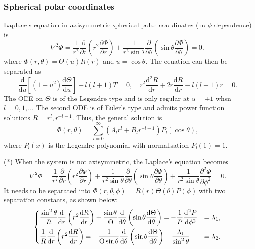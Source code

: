 \documentclass{article}
\begin{document}
\subsubsection{Spherical polar coordinates}
Laplace's equation in axisymmetric spherical polar coordinates (no $\phi$ dependence) is 
\[
    \nabla ^{2} \Phi = \frac{1}{r^{2} } \frac{\partial }{\partial r} \left(r ^{2} \frac{\partial \Phi }{\partial r} \right) + \frac{1}{r^{2} \sin{\theta }}\frac{\partial }{\partial \theta } \left( \sin{\theta} \frac{\partial \Phi }{\partial \theta } \right) = 0,
\]
where $\Phi(r, \theta) = \Theta(u) R(r)$ and $u = \cos{\theta }.$ The equation can then be separated as
\[
    \frac{\mathrm{d}}{\mathrm{d}u} \left[ (1-u^{2}) \frac{\mathrm{d}\Theta }{\mathrm{d}u} \right] + l(l+1) T = 0, \quad 
    r^{2} \frac{\mathrm{d}^{2} R}{\mathrm{d}r} + 2 r \frac{\mathrm{d}R}{\mathrm{d}r} - l(l+1)r = 0.
\]
The ODE on $\Theta$ is of the Legendre type and is only regular at $u = \pm 1$ when $l = 0, 1, \ldots $ The second ODE is of Euler's type and admits power function solutions $R = r^{l}, r^{-l-1}.$ Thus, the general solution is
\[
    \boxed{ 
        \Phi(r,\theta ) = \sum_{l=0}^{\infty} \left( A_l r^l + B_l r^{-l-1}\right) P_l(\cos{\theta}),
    }
\]
where $P_l(x)$ is the Legendre polynomial with normalisation $P_l(1) = 1.$

(*) When the system is not axisymmetric, the Laplace's equation becomes 
\[
    \nabla ^{2} \Phi = \frac{1}{r^{2} } \frac{\partial }{\partial r} \left(r ^{2} \frac{\partial \Phi }{\partial r} \right) + \frac{1}{r^{2} \sin{\theta }}\frac{\partial }{\partial \theta } \left( \sin{\theta} \frac{\partial \Phi }{\partial \theta } \right) + \frac{1}{r^{2} \sin{\theta }} \frac{\partial^{2}  \Phi }{\partial \phi ^{2} } = 0. 
\]
It needs to be separated into $\Phi(r,\theta,\phi) = R(r) \Theta(\theta ) P(\phi )$ with two separation constants, as shown below:
\[
    \begin{dcases}
       \frac{\sin^{2}{\theta }}{R} \frac{\mathrm{d}}{\mathrm{d}r} \left( r^{2} \frac{\mathrm{d}R}{\mathrm{d}r} \right) + \frac{\sin{\theta }}{\Theta}\frac{\mathrm{d}}{\mathrm{d}\theta } \left( \sin{\theta } \frac{\mathrm{d}\Theta }{\mathrm{d}\theta } \right)  = -\frac{1}{P}\frac{\mathrm{d}^{2} P}{\mathrm{d}\phi ^{2} } &= \lambda_1,   \\
       \frac{1}{R}\frac{\mathrm{d}}{\mathrm{d}r} \left(r^{2} \frac{\mathrm{d}R}{\mathrm{d}r} \right) = -\frac{1}{\Theta \sin{\theta }}\frac{\mathrm{d}}{\mathrm{d}\theta } \left( \sin{\theta } \frac{\mathrm{d}\Theta }{\mathrm{d}\theta } \right) + \frac{\lambda_1}{\sin^{2}{\theta }} &= \lambda_2.    
    \end{dcases}
\]
\end{document}
